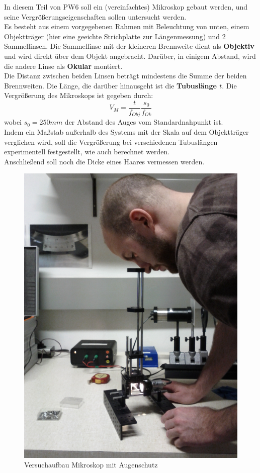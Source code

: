\documentclass[12pt,a4paper]{article}
\begin{document}
\begin{multicols}{2}
In diesem Teil von PW6 soll ein (vereinfachtes) Mikroskop gebaut werden, und seine Vergrößerungseigenschaften sollen untersucht werden.\\
Es besteht aus einem vorgegebenen Rahmen mit Beleuchtung von unten, einem Objektträger (hier eine geeichte Strichplatte zur Längenmessung) und 2 Sammellinsen. Die Sammellinse mit der kleineren Brennweite dient als \textbf{Objektiv} und wird direkt über dem Objekt angebracht. Darüber, in einigem Abstand, wird die andere Linse als \textbf{Okular} montiert.\\
Die Distanz zwischen beiden Linsen beträgt mindestens die Summe der beiden Brennweiten. Die Länge, die darüber hinausgeht ist die \textbf{Tubuslänge $t$}.
Die Vergrößerung des Mikroskops ist gegeben durch:
$$V_M=\frac{t}{f_{Obj}}\frac{s_0}{f_{Ok}}$$
wobei $s_0=250mm$ der Abstand des Auges vom Standardnahpunkt ist.\\
Indem ein Maßstab außerhalb des Systems mit der Skala auf dem Objektträger verglichen wird, soll die Vergrößerung bei verschiedenen Tubuslängen experimentell festgestellt, wie auch berechnet werden.\\
Anschließend soll noch die Dicke eines Haares vermessen werden.

\begin{figure}[H]
	\centering
	\includegraphics[angle=-90,scale=0.1]{./figure/mikroskop.jpg}
	\caption{Versuchaufbau Mikroskop mit Augenschutz}
	\label{fig:mikroskop_aufbau}
\end{figure}


\end{multicols}
\end{document}
